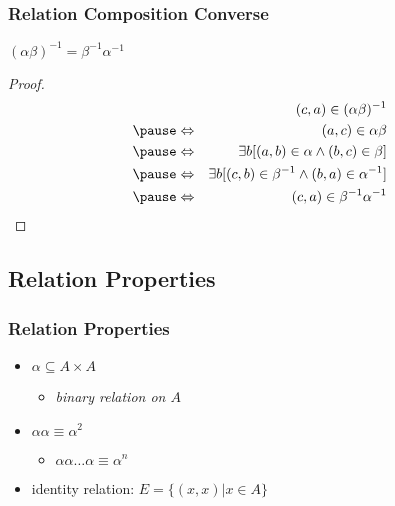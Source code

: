 \documentclass[dvipsnames]{beamer}
\begin{document}
\begin{frame}
  \frametitle{Relation Composition Converse}

  \begin{theorem}
    $(\alpha \beta)^{-1} = \beta^{-1} \alpha^{-1}$
  \end{theorem}

  \pause
  \begin{proof}
    \begin{eqnarray*}
      &                 & (c,a) \in (\alpha \beta)^{-1}\\\pause
      & \Leftrightarrow & (a,c) \in \alpha \beta\\\pause
      & \Leftrightarrow & \exists b [(a,b) \in \alpha
                              \wedge (b,c) \in \beta]\\\pause
      & \Leftrightarrow & \exists b [(c,b) \in \beta^{-1}
                              \wedge (b,a) \in \alpha^{-1}]\\\pause
      & \Leftrightarrow & (c,a) \in \beta^{-1}\alpha^{-1}
    \end{eqnarray*}
  \end{proof}
\end{frame}

\subsection{Relation Properties}

\begin{frame}
  \frametitle{Relation Properties}

  \begin{itemize}
    \item $\alpha \subseteq A \times A$
    \begin{itemize}
      \item \emph{binary relation on $A$}
    \end{itemize}

    \pause
    \medskip
    \item $\alpha \alpha \equiv \alpha^2$
    \begin{itemize}
      \item $\alpha \alpha \dots \alpha \equiv \alpha^n$
    \end{itemize}

    \pause
    \medskip
    \item \alert{identity relation}: $E = \{(x,x) | x \in A\}$
  \end{itemize}
\end{frame}
\end{document}
